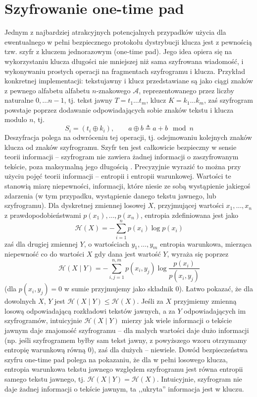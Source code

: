 \documentclass[10pt]{article}
\begin{document}


\section{Szyfrowanie one-time pad}

Jednym z najbardziej atrakcyjnych potencjalnych przypadków użycia dla ewentualnego w pełni bezpiecznego
protokołu dystrybucji klucza jest z pewnością tzw. szyfr z kluczem jednorazowym (one-time pad). Jego
idea opiera się na wykorzystaniu klucza długości nie mniejszej niż sama szyfrowana wiadomość, i
wykonywaniu prostych operacji na fragmentach szyfrogramu i klucza. Przykład konkretnej implementacji:
tekstujawny i klucz przedstawiane są jako ciągi znaków z pewnego alfabetu alfabetu \(n\)-znakowego 
\(\mathcal{A}\), reprezentowanego przez liczby naturalne \(0,\ldots n-1\), tj. tekst jawny 
\(T=t_1\ldots t_m\), klucz \(K=k_1\ldots k_m\), zaś szyfrogram powstaje poprzez dodawanie odpowiadających
sobie znaków tekstu i klucza modulo \(n\), tj.
\[
S_i=\left(t_i\oplus k_i\right),\qquad a\oplus b \triangleq a+b \mod n
\]
Deszyfracja polega na odwróceniu tej operacji, tj. odejmowaniu kolejnych znaków klucza od znaków
szyfrogramu. Szyfr ten jest całkowicie bezpieczny w sensie teorii informacji -- szyfrogram nie zawiera
żadnej informacji o zaszyfrowanym tekście, poza maksymalną jego długością \cite{Shannon49}. Precyzyjnie
wyrazić to można przy użyciu pojęć teorii informacji -- entropii i entropii warunkowej. Wartości te 
stanowią miarę niepewności, informacji, które niesie ze sobą wystąpienie jakiegoś zdarzenia (w tym
przypadku, wystąpienie danego tekstu jawnego, lub szyfrogramu).
Dla dyskretnej zmiennej losowej \(X\), przyjmującej wartości \(x_1,\ldots,x_n\) z prawdopodobieństwami
\(p(x_1),\ldots,p(x_n)\), entropia zdefiniowana jest jako
\[
\mathcal{H}(X)=-\sum_{i=1}^n p(x_i)\log p(x_i)
\]
zaś dla drugiej zmiennej \(Y\), o wartościach \(y_1,\ldots,y_m\) entropia warunkowa, mierząca niepewność
co do wartości \(X\) gdy dana jest wartość \(Y\), wyraża się poprzez
\[
\mathcal{H}(X\mid Y)=-\sum_{i,j=1}^{n,m}p(x_i,y_j)\log \frac{p(x_i)}{p(x_i,y_j)}
\]
(dla \(p(x_i,y_j)=0\) w sumie przyjmujemy jako składnik \(0\)). Łatwo pokazać, że dla dowolnych \(X\),
\(Y\) jest \(\mathcal{H}(X\mid Y)\leq \mathcal{H}(X)\). Jeśli za \(X\) przyjmiemy zmienną losową
odpowiadającą rozkładowi tekstów jawnych, a za \(Y\) odpowiadających im szyfrogramów, intuicyjnie
\(\mathcal{H}(X\mid Y)\) mierzy jak wiele informacji o tekście jawnym daje znajomość szyfrogramu --
dla małych wartości daje dużo informacji (np. jeśli szyfrogramem byłby sam tekst jawny, z powyższego
wzoru otrzymamy entropię warunkową równą \(0\)), zaś dla dużych -- niewiele. Dowód bezpieczeństwa szyfru
one-time pad polega na pokazaniu, że dla w pełni losowego klucza, entropia warunkowa tekstu jawnego
względem szyfrogramu jest równa entropii samego tekstu jawnego, tj. 
\(\mathcal{H}(X\mid Y) = \mathcal{H}(X)\). Intuicyjnie, szyfrogram nie daje żadnej informacji o tekście
jawnym, ta ,,ukryta'' informacja jest w kluczu.
\end{document}
